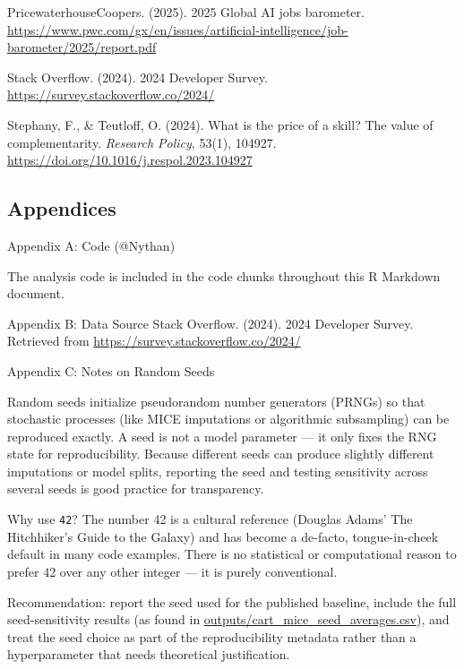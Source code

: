 \documentclass[
]{article}
\begin{document}
PricewaterhouseCoopers. (2025). 2025 Global AI jobs barometer.
\url{https://www.pwc.com/gx/en/issues/artificial-intelligence/job-barometer/2025/report.pdf}

Stack Overflow. (2024). 2024 Developer Survey.
\url{https://survey.stackoverflow.co/2024/}

Stephany, F., \& Teutloff, O. (2024). What is the price of a skill? The
value of complementarity. \emph{Research Policy}, 53(1), 104927.
\url{https://doi.org/10.1016/j.respol.2023.104927}

\subsection{Appendices}\label{appendices}

Appendix A: Code (@Nythan)

The analysis code is included in the code chunks throughout this R
Markdown document.

Appendix B: Data Source Stack Overflow. (2024). 2024 Developer Survey.
Retrieved from \url{https://survey.stackoverflow.co/2024/}

Appendix C: Notes on Random Seeds

Random seeds initialize pseudorandom number generators (PRNGs) so that
stochastic processes (like MICE imputations or algorithmic subsampling)
can be reproduced exactly. A seed is not a model parameter --- it only
fixes the RNG state for reproducibility. Because different seeds can
produce slightly different imputations or model splits, reporting the
seed and testing sensitivity across several seeds is good practice for
transparency.

Why use \texttt{42}? The number 42 is a cultural reference (Douglas
Adams' The Hitchhiker's Guide to the Galaxy) and has become a de-facto,
tongue-in-cheek default in many code examples. There is no statistical
or computational reason to prefer 42 over any other integer --- it is
purely conventional.

Recommendation: report the seed used for the published baseline, include
the full seed-sensitivity results (as found in
\url{outputs/cart_mice_seed_averages.csv}), and treat the seed choice as
part of the reproducibility metadata rather than a hyperparameter that
needs theoretical justification.
\end{document}
